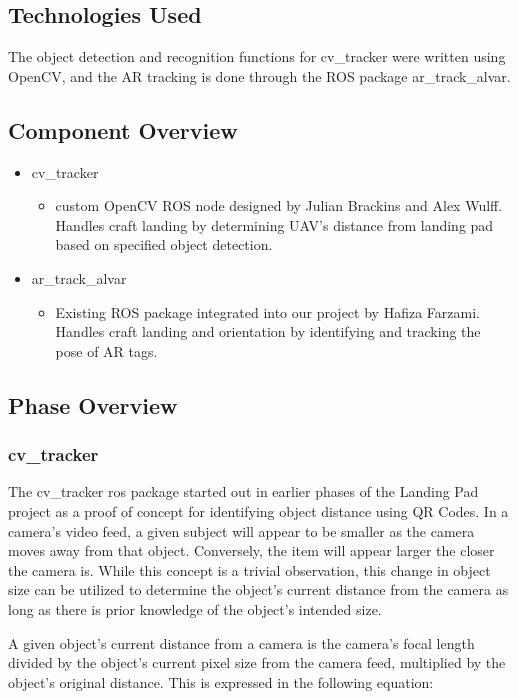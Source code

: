 \subsection{Technologies  Used}
The object detection and recognition functions for cv\_tracker were written using OpenCV, and the AR tracking is done through the ROS package ar\_track\_alvar.

\subsection{Component  Overview}
\begin{itemize}
 	\item cv\_tracker
	\begin{itemize}
		\item[] custom OpenCV ROS node designed by Julian Brackins and Alex Wulff. Handles craft landing by determining UAV's distance from landing pad based on specified object detection.
	\end{itemize}
 	\item ar\_track\_alvar
	\begin{itemize}
		\item[] Existing ROS package integrated into our project by Hafiza Farzami. Handles craft landing and orientation by identifying and tracking the pose of AR tags.
	\end{itemize}
\end{itemize}

\subsection{Phase Overview}

\subsubsection{cv\_tracker}\label{cvtracker}
The cv\_tracker ros package started out in earlier phases of the Landing Pad project as a proof of concept for identifying object distance using QR Codes. In a camera's video feed, a given subject will appear to be smaller as the camera moves away from that object. Conversely, the item will appear larger the closer the camera is. While this concept is a trivial observation, this change in object size can be utilized to determine the object's current distance from the camera as long as there is prior knowledge of the object's intended size.


A given object's current distance from a camera is the camera's focal length divided by the object's current pixel size from the camera feed, multiplied by the object's original distance. This is expressed in the following equation:

